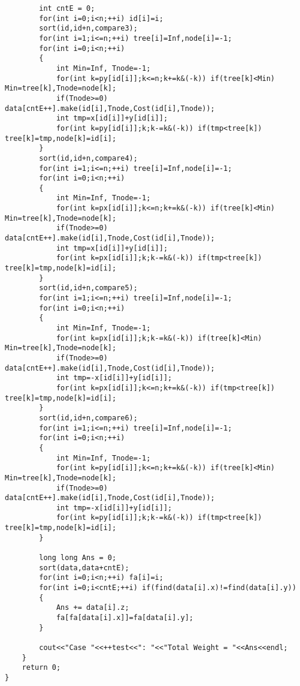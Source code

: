 \begin{lstlisting}
		int cntE = 0;
		for(int i=0;i<n;++i) id[i]=i;
		sort(id,id+n,compare3);
		for(int i=1;i<=n;++i) tree[i]=Inf,node[i]=-1;
		for(int i=0;i<n;++i)
		{
			int Min=Inf, Tnode=-1;
			for(int k=py[id[i]];k<=n;k+=k&(-k)) if(tree[k]<Min) Min=tree[k],Tnode=node[k];
			if(Tnode>=0) data[cntE++].make(id[i],Tnode,Cost(id[i],Tnode));
			int tmp=x[id[i]]+y[id[i]];
			for(int k=py[id[i]];k;k-=k&(-k)) if(tmp<tree[k]) tree[k]=tmp,node[k]=id[i];
		}
		sort(id,id+n,compare4);
		for(int i=1;i<=n;++i) tree[i]=Inf,node[i]=-1;
		for(int i=0;i<n;++i)
		{
			int Min=Inf, Tnode=-1;
			for(int k=px[id[i]];k<=n;k+=k&(-k)) if(tree[k]<Min) Min=tree[k],Tnode=node[k];
			if(Tnode>=0) data[cntE++].make(id[i],Tnode,Cost(id[i],Tnode));
			int tmp=x[id[i]]+y[id[i]];
			for(int k=px[id[i]];k;k-=k&(-k)) if(tmp<tree[k]) tree[k]=tmp,node[k]=id[i];			
		}
		sort(id,id+n,compare5);
		for(int i=1;i<=n;++i) tree[i]=Inf,node[i]=-1;
		for(int i=0;i<n;++i)
		{
			int Min=Inf, Tnode=-1;
			for(int k=px[id[i]];k;k-=k&(-k)) if(tree[k]<Min) Min=tree[k],Tnode=node[k];
			if(Tnode>=0) data[cntE++].make(id[i],Tnode,Cost(id[i],Tnode));
			int tmp=-x[id[i]]+y[id[i]];
			for(int k=px[id[i]];k<=n;k+=k&(-k)) if(tmp<tree[k]) tree[k]=tmp,node[k]=id[i];	
		}
		sort(id,id+n,compare6);
		for(int i=1;i<=n;++i) tree[i]=Inf,node[i]=-1;
		for(int i=0;i<n;++i)
		{
			int Min=Inf, Tnode=-1;
			for(int k=py[id[i]];k<=n;k+=k&(-k)) if(tree[k]<Min) Min=tree[k],Tnode=node[k];
			if(Tnode>=0) data[cntE++].make(id[i],Tnode,Cost(id[i],Tnode));
			int tmp=-x[id[i]]+y[id[i]];
			for(int k=py[id[i]];k;k-=k&(-k)) if(tmp<tree[k]) tree[k]=tmp,node[k]=id[i];
		}
		
		long long Ans = 0;
		sort(data,data+cntE);
		for(int i=0;i<n;++i) fa[i]=i;
		for(int i=0;i<cntE;++i) if(find(data[i].x)!=find(data[i].y))
		{
			Ans += data[i].z;
			fa[fa[data[i].x]]=fa[data[i].y];
		}
		
		cout<<"Case "<<++test<<": "<<"Total Weight = "<<Ans<<endl;
	}
	return 0;
}
	\end{lstlisting}

